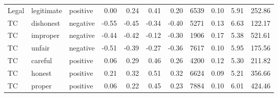 \begin{table}[ht]
\begin{tabular}{lllrrrrrrrr}
  Legal & legitimate & positive & 0.00 & 0.24 & 0.41 & 0.20 & 6539 & 0.10 & 5.91 & 252.86 \\ 
  TC & dishonest & negative & -0.55 & -0.45 & -0.34 & -0.40 & 5271 & 0.13 & 6.63 & 122.17 \\ 
  TC & improper & negative & -0.44 & -0.42 & -0.12 & -0.30 & 1906 & 0.17 & 5.38 & 521.61 \\ 
  TC & unfair & negative & -0.51 & -0.39 & -0.27 & -0.36 & 7617 & 0.10 & 5.95 & 175.56 \\ 
  TC & careful & positive & 0.06 & 0.29 & 0.46 & 0.26 & 4200 & 0.12 & 5.30 & 211.82 \\ 
  TC & honest & positive & 0.21 & 0.32 & 0.51 & 0.32 & 6624 & 0.09 & 5.21 & 356.66 \\ 
  TC & proper & positive & 0.06 & 0.22 & 0.45 & 0.23 & 7884 & 0.10 & 6.01 & 424.46 \\ 
   \hline
\end{tabular}
\end{table}
